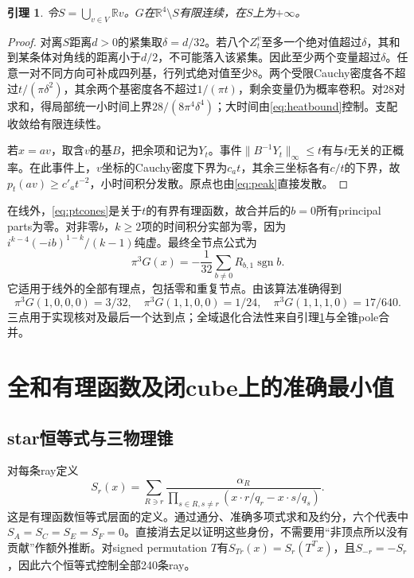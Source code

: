 \documentclass[UTF8,11pt,a4paper,fontset=fandol]{ctexart}
\newtheorem{lemma}[theorem]{引理}
\theoremstyle{remark}\newtheorem{remark}[theorem]{注}
\newcommand{\R}{\mathbb R}\newcommand{\dd}{\,\mathrm d}
\newcommand{\1}{\mathbf1}\newcommand{\pos}[1]{(#1)_+}
\DeclareMathOperator{\sgn}{sgn}\DeclareMathOperator{\rank}{rank}
\begin{document}
\begin{lemma}\label{lem:continuity}
令$S=\bigcup_{v\in V}\R v$。$G$在$\R^4\setminus S$有限连续，在$S$上为$+\infty$。
\end{lemma}
\begin{proof}
对离$S$距离$d>0$的紧集取$\delta=d/32$。若八个$Z_t^v$至多一个绝对值超过$\delta$，其和到某条体对角线的距离小于$d/2$，不可能落入该紧集。因此至少两个变量超过$\delta$。任意一对不同方向可补成四列基，行列式绝对值至少8。两个受限Cauchy密度各不超过$t/(\pi\delta^2)$，其余两个基密度各不超过$1/(\pi t)$，剩余变量仍为概率卷积。对28对求和，得局部统一小时间上界$28/(8\pi^4\delta^4)$；大时间由\eqref{eq:heatbound}控制。支配收敛给有限连续性。

若$x=av$，取含$v$的基$B$，把余项和记为$Y_t$。事件$\|B^{-1}Y_t\|_\infty\le t$有与$t$无关的正概率。在此事件上，$v$坐标的Cauchy密度下界为$c_at$，其余三坐标各有$c/t$的下界，故$p_t(av)\ge c'_at^{-2}$，小时间积分发散。原点也由\eqref{eq:peak}直接发散。
\end{proof}
在线外，\eqref{eq:ptcones}是关于$t$的有界有理函数，故合并后的$b=0$所有principal parts为零。对非零$b$，$k\ge2$项的时间积分实部为零，因为
$i^{k-4}(-ib)^{1-k}/(k-1)$纯虚。最终全节点公式为
\begin{equation}\label{eq:allnodes}
 \pi^3G(x)=-\frac1{32}\sum_{b\ne0}R_{b,1}\sgn b.
\end{equation}
它适用于线外的全部有理点，包括零和重复节点。由该算法准确得到
\begin{equation}\label{eq:anchors}
 \pi^3G(1,0,0,0)=3/32,\quad
 \pi^3G(1,1,0,0)=1/24,\quad
 \pi^3G(1,1,1,0)=17/640.
\end{equation}
三点用于实现核对及最后一个达到点；全域退化合法性来自引理\ref{lem:continuity}与全锥pole合并。

\section{全和有理函数及闭cube上的准确最小值}
\subsection{star恒等式与三物理锥}
对每条ray定义
\[
 S_r(x)=\sum_{R\ni r}\frac{\alpha_R}
 {\prod_{s\in R,s\ne r}(x\cdot r/q_r-x\cdot s/q_s)}.
\]
这是有理函数恒等式层面的定义。通过通分、准确多项式求和及约分，六个代表中$S_A=S_C=S_E=S_F=0$。直接消去足以证明这些身份，不需要用``非顶点所以没有贡献''作额外推断。对signed permutation $T$有$S_{Tr}(x)=S_r(T^Tx)$，且$S_{-r}=-S_r$，因此六个恒等式控制全部240条ray。
\end{document}
